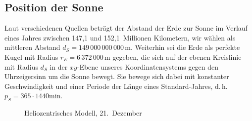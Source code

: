 \documentclass[
    paper=a4,
    DIV14,
    fontsize=12pt,
    pagesize=pdftex,
    toc=bibliographynumbered
]{scrartcl}
\numberwithin{figure}{section}
\numberwithin{equation}{section}
\numberwithin{table}{section}
\begin{document}
\subsection{Position der Sonne}

Laut verschiedenen Quellen beträgt der Abstand der Erde zur Sonne im Verlauf eines Jahres
zwischen 147{,}1 und 152{,}1~Millionen Kilometern, wir wählen als mittleren Abstand $d_S =
149\,000\,000\,000\,\mathrm m$. Weiterhin sei die Erde als perfekte Kugel mit Radius $r_E
= 6\,372\,000\,\mathrm m$ gegeben, die sich auf der ebenen Kreislinie mit Radius $d_S$ in
der $xy$-Ebene unseres Koordinatensystems gegen den Uhrzeigersinn um die Sonne bewegt. Sie
bewege sich dabei mit konstanter Geschwindigkeit und einer Periode der Länge eines
Standard-Jahres, d.\,h.\ $p_S = 365\cdot 1440 \mathrm{min}$.

\begin{figure}[htb]
    \centering
    \caption{Heliozentrisches Modell, 21.\ Dezember}
    \label{fig:helioz}
\end{figure}
\end{document}
